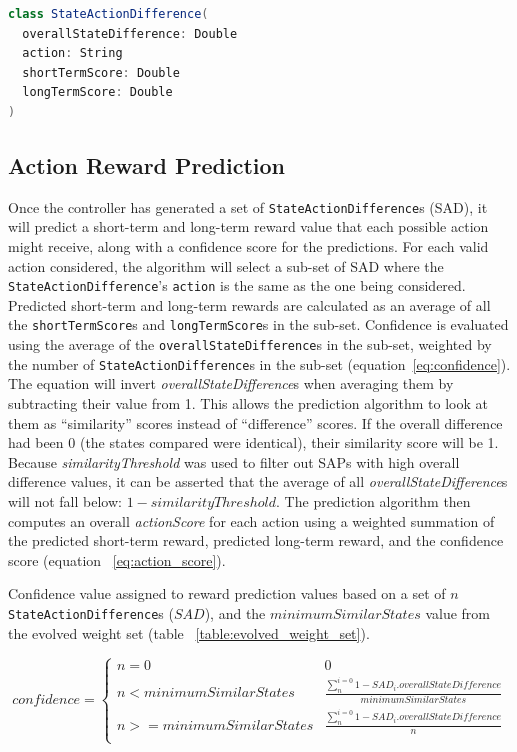 \begin{lstlisting}[language=Scala, label=code:state_action_difference]
class StateActionDifference(
  overallStateDifference: Double
  action: String
  shortTermScore: Double
  longTermScore: Double
)
\end{lstlisting}


\subsection{Action Reward Prediction}
Once the controller has generated a set of \texttt{StateActionDifference}s (SAD), it will predict a short-term and long-term reward value that each possible action might receive, along with a confidence score for the predictions.
For each valid action considered, the algorithm will select a sub-set of SAD where the \texttt{StateActionDifference}'s \texttt{action} is the same as the one being considered.
Predicted short-term and long-term rewards are calculated as an average of all the \texttt{shortTermScore}s and \texttt{longTermScore}s in the sub-set.
Confidence is evaluated using the average of the \texttt{overallStateDifference}s in the sub-set, weighted by the number of \texttt{StateActionDifference}s in the sub-set (equation~\ref{eq:confidence}).
The equation will invert \textit{overallStateDifference}s when averaging them by subtracting their value from 1.
This allows the prediction algorithm to look at them as ``similarity'' scores instead of ``difference'' scores.
If the overall difference had been 0 (the states compared were identical), their similarity score will be 1.
Because \textit{similarityThreshold} was used to filter out SAPs with high overall difference values, it can be asserted that the average of all \textit{overallStateDifference}s will not fall below: $1 - similarityThreshold$.
The prediction algorithm then computes an overall \textit{actionScore} for each action using a weighted summation of the predicted short-term reward, predicted long-term reward, and the confidence score (equation ~\ref{eq:action_score}).

\caption{Confidence value assigned to reward prediction values based on a set of $n$ \texttt{StateActionDifference}s ($SAD$), and the $minimumSimilarStates$ value from the evolved weight set (table ~\ref{table:evolved_weight_set}).}
\begin{equation} \label{eq:confidence}
  confidence = \begin{cases}
    n = 0 & 0 \\
    n < minimumSimilarStates & \frac{\sum_{n}^{i=0} 1 - SAD_{i}.overallStateDifference}{minimumSimilarStates} \\
    n >= minimumSimilarStates & \frac{\sum_{n}^{i=0} 1 - SAD_{i}.overallStateDifference}{n} \\
\end{cases}
\end{equation}

